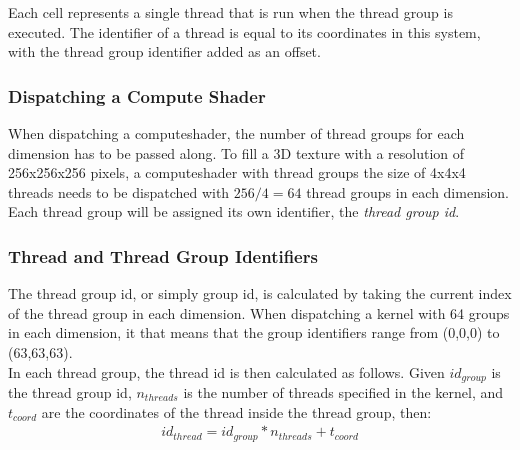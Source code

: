 \begin{figure}[H]
    \label{img:tikz:compute:threads}
\end{figure}
\noindent
Each cell represents a single thread that is run when the thread group is executed.
The identifier of a thread is equal to its coordinates in this system, with the thread group identifier added as an offset.

\subsubsection{Dispatching a Compute Shader}
When dispatching a \gls{computeshader}, the number of thread groups for each dimension has to be passed along.
To fill a 3D texture with a resolution of 256x256x256 pixels, a \gls{computeshader} with thread groups the size of 4x4x4 threads needs to be dispatched with $256 / 4 = 64$ thread groups in each dimension.
\\
Each thread group will be assigned its own identifier, the \emph{thread group id}.

\pagebreak

\subsubsection{Thread and Thread Group Identifiers}
The thread group id, or simply group id, is calculated by taking the current index of the thread group in each dimension.
When dispatching a \gls{kernel} with 64 groups in each dimension, it that means that the group identifiers range from (0,0,0) to (63,63,63).
\\
In each thread group, the thread id is then calculated as follows.
Given $id_{group}$ is the thread group id, $n_{threads}$ is the number of threads specified in the \gls{kernel}, and  $t_{coord}$ are the coordinates of the thread inside the thread group, then:
$$
\begin{array}{l}
    id_{thread} = id_{group} * n_{threads} + t_{coord}
\end{array}
$$

